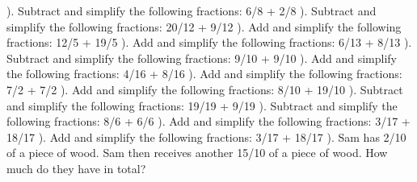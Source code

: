 \documentclass{article}%
\begin{document}
). Subtract and simplify the following fractions: 6/8 + 2/8%
\newline%
\newline%
). Subtract and simplify the following fractions: 20/12 + 9/12%
\newline%
\newline%
). Add and simplify the following fractions: 12/5 + 19/5%
\newline%
\newline%
). Add and simplify the following fractions: 6/13 + 8/13%
\newline%
\newline%
). Subtract and simplify the following fractions: 9/10 + 9/10%
\newline%
\newline%
). Add and simplify the following fractions: 4/16 + 8/16%
\newline%
\newline%
). Add and simplify the following fractions: 7/2 + 7/2%
\newline%
\newline%
). Add and simplify the following fractions: 8/10 + 19/10%
\newline%
\newline%
). Subtract and simplify the following fractions: 19/19 + 9/19%
\newline%
\newline%
). Subtract and simplify the following fractions: 8/6 + 6/6%
\newline%
\newline%
). Add and simplify the following fractions: 3/17 + 18/17%
\newline%
\newline%
). Add and simplify the following fractions: 3/17 + 18/17%
\newline%
\newline%
). Sam has 2/10 of a piece of wood. Sam then receives another 15/10 of a piece of wood. How much do they have in total?%
\end{document}
